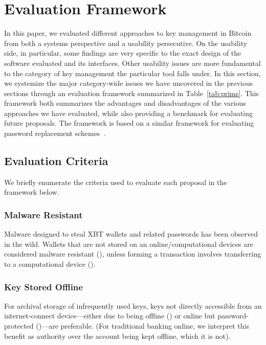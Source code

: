 

\section{Evaluation Framework}

In this paper, we evaluated different approaches to key management in Bitcoin from both a systems perspective and a usability persecutive. On the usability side, in particular, some findings are very specific to the exact design of the software evaluated and its interfaces. Other usability issues are more fundamental to the category of key management the particular tool falls under. In this section, we systemize the major category-wide issues we have uncovered in the previous sections through an evaluation framework summarized in Table~\ref{tab:prims}. This framework both summarizes the advantages and disadvantages of the various approaches we have evaluated, while also providing a benchmark for evaluating future proposals. The framework is based on a similar framework for evaluating password replacement schemes~\cite{BHOS12}.

\subsection{Evaluation Criteria}

We briefly enumerate the criteria used to evaluate each proposal in the framework below. 

\subsubsection{Malware Resistant}
\label{Malware Resistant}
Malware designed to steal XBT wallets and related passwords has been observed in the wild. Wallets that are not stored on an online/computational devices are considered malware resistant (\full), unless forming a transaction involves transferring to a computational device (\prt). 

\subsubsection{Key Stored Offline} 
\label{Key Kept Offline}
For archival storage of infrequently used keys, keys not directly accessible from an internet-connect device---either due to being offline (\full) or online but password-protected (\prt)---are preferable. (For traditional banking online, we interpret this benefit as authority over the account being kept offline, which it is not).

